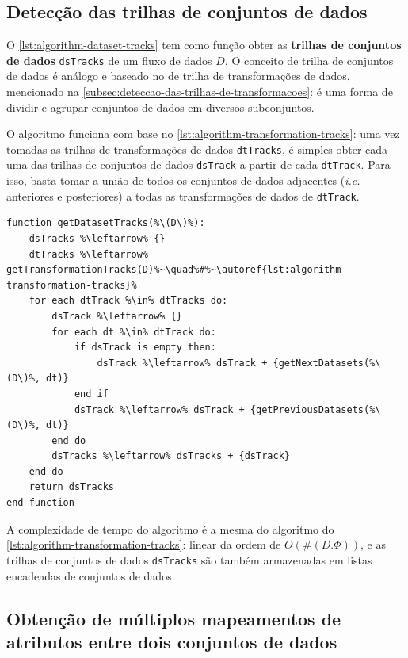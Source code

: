 \subsection{Detecção das trilhas de conjuntos de dados}

O \autoref{lst:algorithm-dataset-tracks} tem como função obter as \textbf{trilhas de conjuntos de dados} \texttt{dsTracks} de um fluxo de dados \( D \). O conceito de trilha de conjuntos de dados é análogo e baseado no de trilha de transformações de dados, mencionado na \autoref{subsec:deteccao-das-trilhas-de-transformacoes}: é uma forma de dividir e agrupar conjuntos de dados em diversos subconjuntos.

O algoritmo funciona com base no \autoref{lst:algorithm-transformation-tracks}: uma vez tomadas as trilhas de transformações de dados \texttt{dtTracks}, é simples obter cada uma das trilhas de conjuntos de dados \texttt{dsTrack} a partir de cada \texttt{dtTrack}. Para isso, basta tomar a união de todos os conjuntos de dados adjacentes (\textit{i.e.} anteriores e posteriores) a todas as transformações de dados de \texttt{dtTrack}.

\begin{minipage}[c]{0.95\textwidth}
\begin{lstlisting}[language=pseudocode,label={lst:algorithm-dataset-tracks},caption={[Detecção das trilhas de conjuntos de dados]Detecção do rastro do fluxo de dados no nível de trilhas de conjuntos de dados.}]
function getDatasetTracks(%\(D\)%):
    dsTracks %\leftarrow% {}
    dtTracks %\leftarrow% getTransformationTracks(D)%~\quad%#%~\autoref{lst:algorithm-transformation-tracks}%
    for each dtTrack %\in% dtTracks do:
        dsTrack %\leftarrow% {}
        for each dt %\in% dtTrack do:
            if dsTrack is empty then:
                dsTrack %\leftarrow% dsTrack + {getNextDatasets(%\(D\)%, dt)}
            end if
            dsTrack %\leftarrow% dsTrack + {getPreviousDatasets(%\(D\)%, dt)}
        end do
        dsTracks %\leftarrow% dsTracks + {dsTrack}
    end do
    return dsTracks
end function
\end{lstlisting}
\end{minipage}

A complexidade de tempo do algoritmo é a mesma do algoritmo do \autoref{lst:algorithm-transformation-tracks}: linear da ordem de \( O(\#(D.\Phi)) \), e as trilhas de conjuntos de dados \texttt{dsTracks} são também armazenadas em listas encadeadas de conjuntos de dados.

\subsection{Obtenção de múltiplos mapeamentos de atributos entre dois conjuntos de dados}

